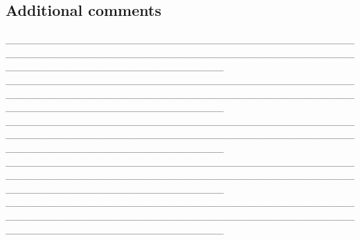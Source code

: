 \documentclass{article}
\newcommand{\ssctn}[1]{\subsection{#1} }
\begin{document}
\ssctn{Additional comments}
	\_\_\_\_\_\_\_\_\_\_\_\_\_\_\_\_\_\_\_\_\_\_\_\_\_\_\_\_\_\_\_\_\_\_\_\_\_\_\_\_\_\_\_\_\_\_\_\_\_\_\_\_\_\_\_\_\_\_\_\_\_\_\_\_\_\_\_\_\_\_\_\_\_\_\_\_\_\_\_\_\_\_\_\_\_\_\_\_\_\_\_\_\_\_\_\_\_\_\_\_\_\_\_\_\_\_\_\_\_\_\_\_\_\_\_\_\_\_\_\_\_\_\_\_\_\_
	\\\_\_\_\_\_\_\_\_\_\_\_\_\_\_\_\_\_\_\_\_\_\_\_\_\_\_\_\_\_\_\_\_\_\_\_\_\_\_\_\_\_\_\_\_\_\_\_\_\_\_\_\_\_\_\_\_\_\_\_\_\_\_\_\_\_\_\_\_\_\_\_\_\_\_\_\_\_\_\_\_\_\_\_\_\_\_\_\_\_\_\_\_\_\_\_\_\_\_\_\_\_\_\_\_\_\_\_\_\_\_\_\_\_\_\_\_\_\_\_\_\_\_\_\_\_\_
	\\\_\_\_\_\_\_\_\_\_\_\_\_\_\_\_\_\_\_\_\_\_\_\_\_\_\_\_\_\_\_\_\_\_\_\_\_\_\_\_\_\_\_\_\_\_\_\_\_\_\_\_\_\_\_\_\_\_\_\_\_\_\_\_\_\_\_\_\_\_\_\_\_\_\_\_\_\_\_\_\_\_\_\_\_\_\_\_\_\_\_\_\_\_\_\_\_\_\_\_\_\_\_\_\_\_\_\_\_\_\_\_\_\_\_\_\_\_\_\_\_\_\_\_\_\_\_
	\\\_\_\_\_\_\_\_\_\_\_\_\_\_\_\_\_\_\_\_\_\_\_\_\_\_\_\_\_\_\_\_\_\_\_\_\_\_\_\_\_\_\_\_\_\_\_\_\_\_\_\_\_\_\_\_\_\_\_\_\_\_\_\_\_\_\_\_\_\_\_\_\_\_\_\_\_\_\_\_\_\_\_\_\_\_\_\_\_\_\_\_\_\_\_\_\_\_\_\_\_\_\_\_\_\_\_\_\_\_\_\_\_\_\_\_\_\_\_\_\_\_\_\_\_\_\_
	\\\_\_\_\_\_\_\_\_\_\_\_\_\_\_\_\_\_\_\_\_\_\_\_\_\_\_\_\_\_\_\_\_\_\_\_\_\_\_\_\_\_\_\_\_\_\_\_\_\_\_\_\_\_\_\_\_\_\_\_\_\_\_\_\_\_\_\_\_\_\_\_\_\_\_\_\_\_\_\_\_\_\_\_\_\_\_\_\_\_\_\_\_\_\_\_\_\_\_\_\_\_\_\_\_\_\_\_\_\_\_\_\_\_\_\_\_\_\_\_\_\_\_\_\_\_\_
\end{document}
